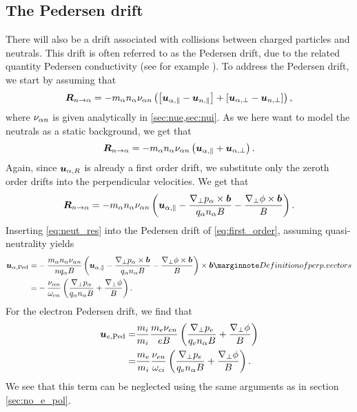\subsection{The Pedersen drift}
%
There will also be a drift associated with collisions between charged particles and neutrals.
This drift is often referred to as the Pedersen drift, due to the related quantity Pedersen conductivity (see for example \cite{Baumjohann1997book}).
To address the Pedersen drift, we start by assuming that
%
\begin{align*}
    \boldsymbol{R}_{n\to\alpha} =
    -
     m_\alpha n_\alpha \nu_{\alpha n}\left(
        \left[\boldsymbol{u}_{\alpha,\|}-\boldsymbol{u}_{n,\|} \right]
        +
        \left[\boldsymbol{u}_{\alpha,\perp}-\boldsymbol{u}_{n,\perp} \right]
        \right),
\end{align*}
%
where $\nu_{\alpha n}$ is given analytically in \cref{sec:nue,sec:nui}.
As we here want to model the neutrals as a static background, we get that
%
\begin{align*}
    \boldsymbol{R}_{n\to\alpha} =
    -
     m_\alpha n_\alpha \nu_{\alpha n}\left(
        \boldsymbol{u}_{\alpha,\|}
        +
        \boldsymbol{u}_{\alpha,\perp}
        \right).
\end{align*}
%
Again, since $\boldsymbol{u}_{\alpha,R}$ is already a first order drift, we substitute only the zeroth order drifts into the perpendicular velocities.
We get that
%
\begin{align}
    \boldsymbol{R}_{n\to\alpha} =
    - m_\alpha n_\alpha \nu_{\alpha n}\left( \boldsymbol{u}_{\alpha,\|}
    - \frac{\nabla_\perp p_\alpha \times \boldsymbol{b}}{q_\alpha n_\alpha B}
    - \frac{\nabla_\perp \phi \times \boldsymbol{b}}{B} \right).
    \label{eq:neut_res}
\end{align}
%
Inserting \cref{eq:neut_res} into the Pedersen drift of \cref{eq:first_order}, assuming quasi-neutrality yields
%
\begin{align*}
    \ve{u}_{\a,\text{Ped}}
    =&
    - \frac{ m_\a n_\a \nu_{\a n} }{n q_\a B} \L( \ve{u}_{\a,\|}
    - \frac{\grad_\perp p_\a \times \ve{b}}{q_\a n_\a B}
    - \frac{\grad_\perp \phi \times \ve{b}}{B} \R) \times\ve{b}
    \note{Definition of perp. vectors}
    \\
    =&
    - \frac{\nu_{\a n} }{\om_{c\a}}
    \L(\frac{\grad_\perp p_\a}{q_\a n_\a B}
    + \frac{\grad_\perp \phi}{B} \R).
\end{align*}
%
For the electron Pedersen drift, we find that
%
\begin{align*}
    \boldsymbol{u}_{e,\text{Ped}}
    =&
    \frac{m_i}{m_i}\frac{ m_e \nu_{e n} }{e B}
    \left(\frac{\nabla_\perp p_e}{q_e n_\alpha B}
    + \frac{\nabla_\perp \phi}{B} \right)
    \\
    =&
    \frac{m_e}{m_i}\frac{\nu_{e n} }{\omega_{ci}}
    \left(\frac{\nabla_\perp p_e}{q_e n_\alpha B}
    + \frac{\nabla_\perp \phi}{B} \right).
\end{align*}
%
We see that this term can be neglected using the same arguments as in section \cref{sec:no_e_pol}.

